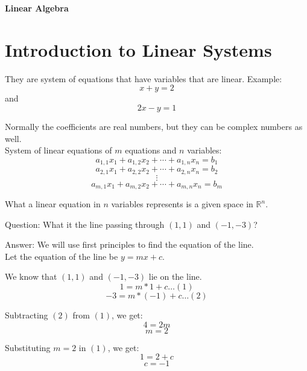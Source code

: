 \documentclass{article}
\begin{document}
\begin{center}
    \begin{LARGE}
        \textbf{Linear Algebra}
    \end{LARGE}
\end{center}

\section{Introduction to Linear Systems}
They are system of equations that have variables that are linear.
Example: $$x + y = 2$$ and $$2x - y = 1$$

Normally the coefficients are real numbers, but they can be complex numbers as well. \\[1pt]
System of linear equations of $m$ equations and $n$ variables:
    $$
    a_{1,1} x_1 + a_{1,2} x_2 + \cdots + a_{1,n} x_n = b_1
    $$
    $$
    a_{2,1} x_1 + a_{2,2} x_2 + \cdots + a_{2,n} x_n = b_2
    $$
    $$
    \vdots
    $$
    $$
    a_{m,1} x_1 + a_{m,2} x_2 + \cdots + a_{m,n} x_n = b_m
    $$

What a linear equation in $n$ variables represents is a given space in $\mathbb{R}^n$.

\begin{paragraph}{Question:}
What it the line passing through $(1,1)$ and $(-1,-3)$?
\end{paragraph}     
\begin{paragraph}{Answer:}
    We will use first principles to find the equation of the line.\\[1pt]
    Let the equation of the line be $y = mx + c$.
    
    We know that $(1,1)$ and $(-1,-3)$ lie on the line.\\[1pt]
    $$1 = m*1 + c \dots (1)$$
    $$-3 = m*(-1) + c \dots (2)$$

    Subtracting $(2)$ from $(1)$, we get:
    $$4 = 2m$$
    $$m = 2$$

    Substituting $m = 2$ in $(1)$, we get:
    $$1 = 2 + c$$
    $$c = -1$$
    
\end{paragraph}
\end{document}
